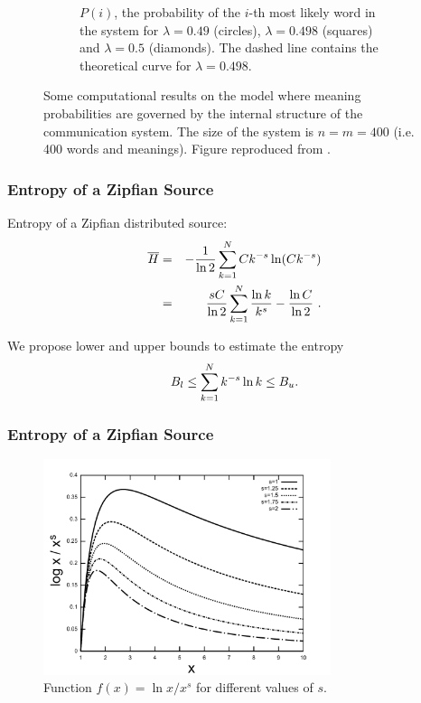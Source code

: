 \documentclass{beamer}
\begin{document}
{\begin{figure}
\begin{subfigure}[b]{0.5\textwidth}
{          \vspace{-0.2cm}
          \caption{\scriptsize $P(i)$, the probability of the $i$-th most likely word in the system for $\lambda  = 0.49$ (circles), $\lambda = 0.498$ (squares) and $\lambda = 0.5$ (diamonds). The dashed line contains the theoretical curve for $\lambda = 0.498$.}
          \label{fig:cancho_figB}
          }
      \end{subfigure}
      \vspace{-0.6cm}
      \caption{\scriptsize Some computational results on the model where meaning probabilities are governed by the internal structure of the communication system. The size of the system is $n = m = 400$ (i.e. 400 words and meanings). Figure reproduced from \cite{cancho2005}.}
        \label{fig:cancho}
\end{figure}
}



\frame
{
  \frametitle{Entropy of a Zipfian Source}
  Entropy of a Zipfian distributed source:
  \begin{eqnarray}
  \label{eq:ent_zipfian_source}
  \overline{H} &=& -\frac{1}{\ln 2} \sum_{k=1}^N Ck^{-s} \ln (Ck^{-s}) \nonumber \\
               &=& \frac{sC}{\ln 2} \sum_{k=1}^N \frac{\ln k}{k^s} - \frac{\ln C}{\ln 2} \textmd{ .}
  \end{eqnarray} 

  We propose lower and upper bounds to estimate the entropy
  \begin{equation}
  B_l \leq \sum_{k=1}^{N} k^{-s} \ln k \leq B_u \textmd{.}
  \end{equation}

}


\frame
{
  \frametitle{Entropy of a Zipfian Source}
  \begin{figure}[h]
  \centering
  \includegraphics[width=0.75\textwidth]{images/logk_ks.pdf}
  \caption{Function $f(x)=\ln x / x^s$ for different values of $s$.}
  \label{fig:logk_ks}
  \end{figure}
}
\end{document}
